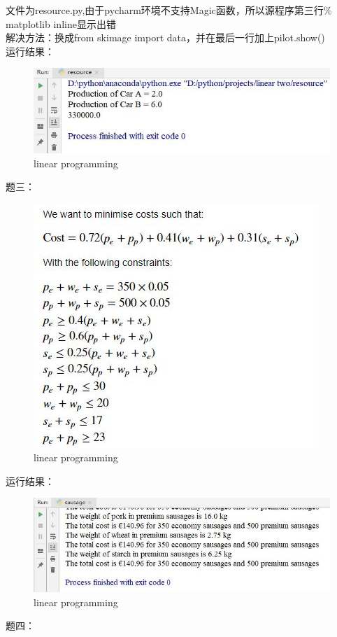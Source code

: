 \documentclass[UTF8]{ctexart}
\begin{document}
文件为resource.py,由于pycharm环境不支持Magic函数，所以源程序第三行$\%$matplotlib inline显示出错\\
解决方法：换成from skimage import data，并在最后一行加上pilot.show()\\
运行结果：\\
\begin{figure}
  \includegraphics[width=.8\linewidth]{resource.JPG}
  \caption{linear programming}
  \label{fig:boat1}
\end{figure}
题三：\\
\begin{figure}
  \includegraphics[width=.8\linewidth]{sausage.JPG}
  \caption{linear programming}
  \label{fig:boat1}
\end{figure}
运行结果：\\
\begin{figure}
  \includegraphics[width=.8\linewidth]{sausag.JPG}
  \caption{linear programming}
  \label{fig:boat1}
\end{figure}
题四：\\
\end{document}
